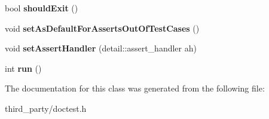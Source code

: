 \begin{DoxyCompactItemize}
bool {\bfseries should\+Exit} ()
\item 
\mbox{\label{classdoctest_1_1_context_ae85cecc7689f009e23cba383484773b2}} 
void {\bfseries set\+As\+Default\+For\+Asserts\+Out\+Of\+Test\+Cases} ()
\item 
\mbox{\label{classdoctest_1_1_context_a669dd0a596a611eeb0decdb78b661a90}} 
void {\bfseries set\+Assert\+Handler} (detail\+::assert\+\_\+handler ah)
\item 
\mbox{\label{classdoctest_1_1_context_a8059b137ef41cbe6c5d8160806a3cc63}} 
int {\bfseries run} ()
\end{DoxyCompactItemize}


The documentation for this class was generated from the following file\+:\begin{DoxyCompactItemize}
\item 
third\+\_\+party/doctest.\+h\end{DoxyCompactItemize}
